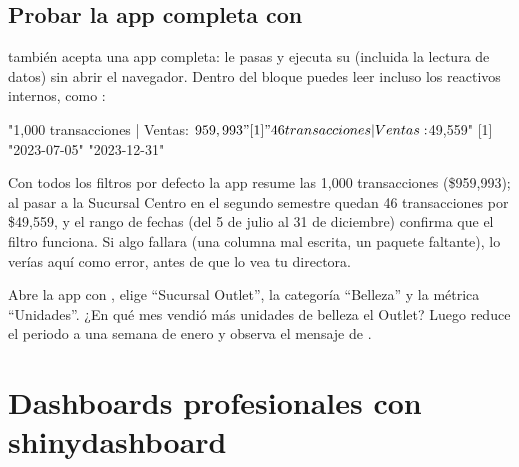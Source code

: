 \subsection{Probar la app completa con \texorpdfstring{}{testServer()}}

 también acepta una app completa: le pasas
 y ejecuta su  (incluida la
lectura de datos) sin abrir el navegador. Dentro del bloque puedes leer
incluso los reactivos internos, como :

\begin{rsalida}
[1] "1,000 transacciones  |  Ventas: $959,993"
[1] "46 transacciones  |  Ventas: $49,559"
[1] "2023-07-05" "2023-12-31"
\end{rsalida}

Con todos los filtros por defecto la app resume las 1,000 transacciones
(\$959,993); al pasar a la Sucursal Centro en el segundo semestre quedan
46 transacciones por \$49,559, y el rango de fechas (del 5 de julio al 31
de diciembre) confirma que el filtro funciona. Si algo fallara (una columna mal escrita, un paquete faltante),
lo verías aquí como error, antes de que lo vea tu directora.

\begin{hazlotu}
Abre la app con ,
elige ``Sucursal Outlet'', la categoría ``Belleza'' y la métrica
``Unidades''. ¿En qué mes vendió más unidades de belleza el Outlet? Luego
reduce el periodo a una semana de enero y observa el mensaje de
.
\end{hazlotu}

\section{Dashboards profesionales con shinydashboard}
\label{sec:m6-shinydashboard}

